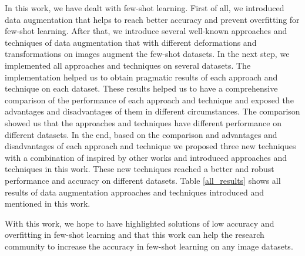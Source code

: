 In this work, we have dealt with few-shot learning. First of all, we introduced data augmentation
that helps to reach better accuracy and prevent overfitting for few-shot learning. After that, we
introduce several well-known approaches and techniques of data augmentation that with different
deformations and transformations on images augment the few-shot datasets.  In the next step, we
implemented all approaches and techniques on several datasets. The implementation helped us to
obtain pragmatic results of each approach and technique on each dataset. These results helped us to
have a comprehensive comparison of the performance of each approach and technique and exposed the
advantages and disadvantages of them in different circumstances. The comparison showed us that the
approaches and techniques have different performance on different datasets. In the end, based on the
comparison and advantages and disadvantages of each approach and technique we proposed three new
techniques with a combination of inspired by other works and introduced approaches and techniques in
this work. These new techniques reached a better and robust performance and accuracy on different
datasets. Table \ref{all_results} shows all results of data augmentation approaches and techniques introduced
and mentioned in this work.


With this work, we hope to have highlighted solutions of low accuracy and overfitting in few-shot learning and that this work can help the research community to increase the accuracy in few-shot learning on any image datasets.